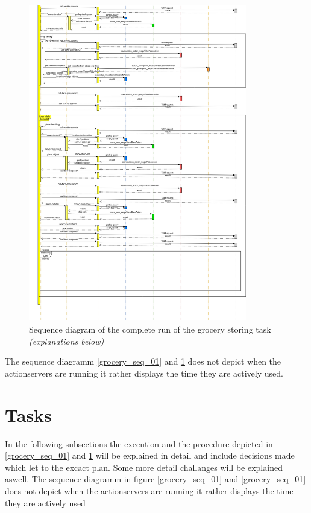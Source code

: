 \documentclass[main.tex]{subfiles}
\begin{document}
		\begin{figure}	
			\centering
			\includegraphics[width=0.85\textwidth]{pictures/diagramms/second-part-grocery-sequence.png}
			\caption{Sequence diagram of the complete run of the grocery storing task \textit{(explanations below)}}
			\label{grocery_seq_02}
		\end{figure}
	
	
		The sequence diagramm \ref{grocery_seq_01} and \ref{grocery_seq_02} does not depict when the actionservers are running it rather displays the time they are actively used.

	\section{Tasks}
	In the following subsections the execution and the procedure depicted in \ref{grocery_seq_01} and \ref{grocery_seq_02} will be explained in detail and include decisions made which let to the excact plan. Some more detail challanges will be explained aswell.
		The sequence diagramm in figure \ref{grocery_seq_01} and \ref{grocery_seq_01} does not depict when the actionservers are running it rather displays the time they are actively used	
	
\end{document}
